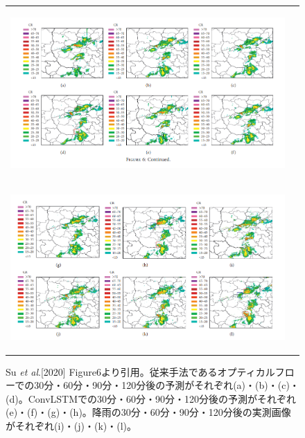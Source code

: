 \begin{figure}[H]
	\begin{tabular}{cc}
		\begin{minipage}[t]{1.0\hsize}
		\begin{center}
		\includegraphics[width=0.9\linewidth,clip]{fig/intro/su-et-al-fig6-1.png}
		\label{a}
		\end{center}
		\end{minipage}\\
		
		\begin{minipage}[t]{1.0\hsize}	
		\begin{center}
		\includegraphics[width=0.9\linewidth,clip]{fig/intro/su-et-al-fig6-2.png}
		\label{b}
		\end{center}
		\end{minipage}
	\end{tabular}
	\captionsetup{width=0.9\linewidth}
	\caption{Su \textit{et al}.[2020] Figure6より引用。従来手法であるオプティカルフローでの30分・60分・90分・120分後の予測がそれぞれ(a)・(b)・(c)・(d)。ConvLSTMでの30分・60分・90分・120分後の予測がそれぞれ(e)・(f)・(g)・(h)。降雨の30分・60分・90分・120分後の実測画像がそれぞれ(i)・(j)・(k)・(l)。}
	\label{fig:su-et-al-fig6}
\end{figure}

